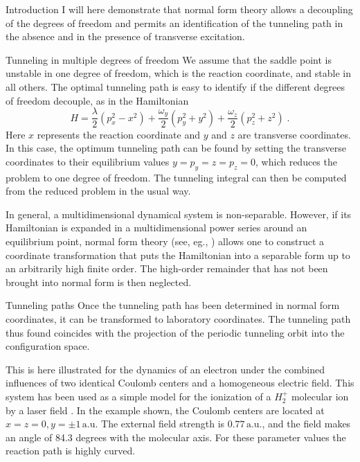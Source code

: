 \documentclass{theo1poster}[2003/04/25]
\begin{document}
\begin{poster}{3}
\begin{sheet}{Introduction}
I will here demonstrate that normal form theory allows a decoupling of the
degrees of freedom and permits an identification
of the tunneling path in the absence and in the presence of transverse
excitation.
\end{sheet}


\begin{sheet}{Tunneling in multiple degrees of freedom}
We assume that the saddle point is unstable in one degree of freedom, which
is the reaction coordinate, and stable in all others.
The optimal tunneling path is easy to identify if the
different degrees of freedom decouple, as in the Hamiltonian
\begin{equation}
  H=\frac{\lambda}{2}(p_x^2-x^2) + \frac{\omega_y}{2}(p_y^2+y^2)
   +\frac{\omega_z}{2}(p_z^2+z^2) \;.
\end{equation}
Here $x$ represents the reaction coordinate and $y$ and $z$ are transverse
coordinates. In this case, the optimum tunneling path can be found by
setting the transverse coordinates to their equilibrium values
$y=p_y=z=p_z=0$, which reduces the problem to one degree of freedom. The
tunneling integral can then be computed from the reduced problem in the
usual way.

In general, a multidimensional dynamical system is non-separable. However,
if its Hamiltonian is expanded in a multidimensional power series around an
equilibrium point, normal form theory (see, eg., \cite{Jorba99}) allows one
to construct a coordinate transformation that puts the Hamiltonian into a
separable form up to an arbitrarily high finite order.  The high-order
remainder that has not been brought into normal form is then neglected.
\end{sheet}


\begin{sheet}{Tunneling paths}
Once the tunneling path has been determined in normal form coordinates, it
can be transformed to laboratory coordinates. The tunneling path thus
found coincides with the projection of the periodic tunneling orbit into the
configuration space.

This is here illustrated for the dynamics of an electron under the combined
influences of two identical Coulomb centers and a homogeneous electric
field. This system has been used as a simple model for the ionization of a
$H_2^+$ molecular ion by a laser field \cite{Bandrauk00}. In the example
shown, the Coulomb centers are located at $x=z=0, y=\pm 1\,\text{a.u.}$ The
external field strength is $0.77\,\text{a.u.}$, and the field makes an
angle of 84.3 degrees with the molecular axis. For these parameter
values the reaction path is highly curved.


\end{sheet}
\end{poster}
\end{document}
